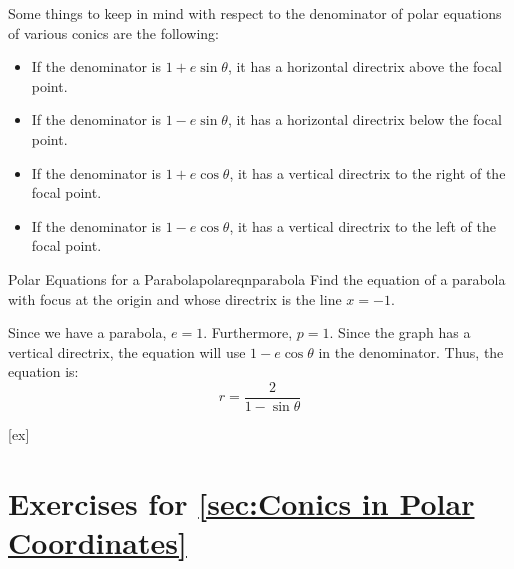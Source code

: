 Some things to keep in mind with respect to the denominator of polar equations of various conics are the following:
\begin{itemize}\setlength{\itemsep}{0 in}
\item If the denominator is $1 + e \sin\theta$, it has a horizontal directrix above the focal point.
\item If the denominator is $1 - e \sin\theta$, it has a horizontal directrix below the focal point.
\item If the denominator is $1 + e \cos\theta$, it has a vertical directrix to the right of the focal point.
\item If the denominator is $1 - e \cos\theta$, it has a vertical directrix to the left of the focal point. 
\end{itemize}

\begin{example}{Polar Equations for a Parabola}{polareqnparabola}
Find the equation of a parabola with focus at the origin and whose directrix is the line $x=-1$.
\end{example}

\begin{solution}
Since we have a parabola, $e=1$.
Furthermore, $p=1$.
Since the graph has a vertical directrix, the equation will use $1 - e \cos\theta$ in the denominator.
Thus, the equation is:
$$r=\frac{2}{1-\sin\theta}$$
\end{solution}


[ex]
\section*{Exercises for \ref{sec:Conics in Polar Coordinates}}

